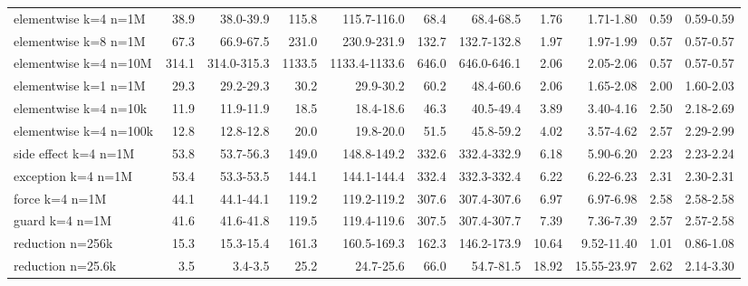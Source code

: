 \begin{tabular}{lrrrrrrrrrr}
elementwise k=4 n=1M & 38.9 & 38.0-39.9 & 115.8 & 115.7-116.0 & 68.4 & 68.4-68.5 & 1.76 & 1.71-1.80 & 0.59 & 0.59-0.59 \\
elementwise k=8 n=1M & 67.3 & 66.9-67.5 & 231.0 & 230.9-231.9 & 132.7 & 132.7-132.8 & 1.97 & 1.97-1.99 & 0.57 & 0.57-0.57 \\
elementwise k=4 n=10M & 314.1 & 314.0-315.3 & 1133.5 & 1133.4-1133.6 & 646.0 & 646.0-646.1 & 2.06 & 2.05-2.06 & 0.57 & 0.57-0.57 \\
elementwise k=1 n=1M & 29.3 & 29.2-29.3 & 30.2 & 29.9-30.2 & 60.2 & 48.4-60.6 & 2.06 & 1.65-2.08 & 2.00 & 1.60-2.03 \\
elementwise k=4 n=10k & 11.9 & 11.9-11.9 & 18.5 & 18.4-18.6 & 46.3 & 40.5-49.4 & 3.89 & 3.40-4.16 & 2.50 & 2.18-2.69 \\
elementwise k=4 n=100k & 12.8 & 12.8-12.8 & 20.0 & 19.8-20.0 & 51.5 & 45.8-59.2 & 4.02 & 3.57-4.62 & 2.57 & 2.29-2.99 \\
side effect k=4 n=1M & 53.8 & 53.7-56.3 & 149.0 & 148.8-149.2 & 332.6 & 332.4-332.9 & 6.18 & 5.90-6.20 & 2.23 & 2.23-2.24 \\
exception k=4 n=1M & 53.4 & 53.3-53.5 & 144.1 & 144.1-144.4 & 332.4 & 332.3-332.4 & 6.22 & 6.22-6.23 & 2.31 & 2.30-2.31 \\
force k=4 n=1M & 44.1 & 44.1-44.1 & 119.2 & 119.2-119.2 & 307.6 & 307.4-307.6 & 6.97 & 6.97-6.98 & 2.58 & 2.58-2.58 \\
guard k=4 n=1M & 41.6 & 41.6-41.8 & 119.5 & 119.4-119.6 & 307.5 & 307.4-307.7 & 7.39 & 7.36-7.39 & 2.57 & 2.57-2.58 \\
reduction n=256k & 15.3 & 15.3-15.4 & 161.3 & 160.5-169.3 & 162.3 & 146.2-173.9 & 10.64 & 9.52-11.40 & 1.01 & 0.86-1.08 \\
reduction n=25.6k & 3.5 & 3.4-3.5 & 25.2 & 24.7-25.6 & 66.0 & 54.7-81.5 & 18.92 & 15.55-23.97 & 2.62 & 2.14-3.30 \\
\bottomrule
\end{tabular}
